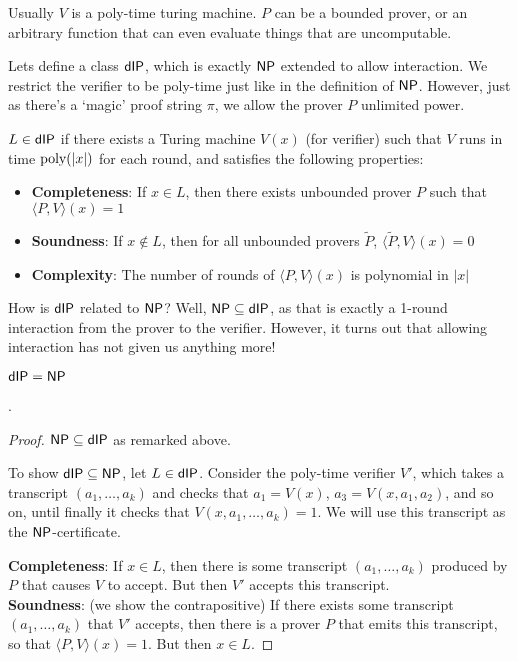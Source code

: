 \documentclass{article}
\begin{document}
Usually $V$ is a poly-time turing machine. $P$ can be a bounded prover, or an arbitrary function that can even evaluate things that are uncomputable.

Lets define a class $\mathsf{dIP}$, which is exactly $\mathsf{NP}$ extended to allow interaction.
We restrict the verifier to be poly-time just like in the definition of $\mathsf{NP}$.
However, just as there's a `magic' proof string $\pi$, we allow the prover $P$ unlimited power.

\begin{definition}
    $L \in \mathsf{dIP}$ if there exists a Turing machine $V(x)$ (for verifier) such that
    $V$ runs in time $\operatorname*{\textup{poly}}(|x|)$ for each round, and satisfies the following properties:
    \begin{itemize}
        \item \textbf{Completeness}: If $x \in L$, then there exists unbounded prover $P$ such that $\langle P, V \rangle(x) = 1$
        \item \textbf{Soundness}: If $x \notin L$, then for all unbounded provers $\tilde{P}$, $\langle \tilde{P}, V \rangle(x) = 0$
        \item \textbf{Complexity}: The number of rounds of $\langle P, V \rangle(x)$ is polynomial in $|x|$
    \end{itemize}
\end{definition}

How is $\mathsf{dIP}$ related to $\mathsf{NP}$? Well, $\mathsf{NP} \subseteq \mathsf{dIP}$, as that is exactly a 1-round interaction from the prover to the verifier.
However, it turns out that allowing interaction has not given us anything more!

\begin{claim} $\mathsf{dIP} = \mathsf{NP}$\end{claim}.
\begin{proof}
    $\mathsf{NP} \subseteq \mathsf{dIP}$ as remarked above.

    To show $\mathsf{dIP} \subseteq \mathsf{NP}$, let $L \in \mathsf{dIP}$.
    Consider the poly-time verifier $V'$, which takes a transcript $(a_1, \ldots, a_k)$ and checks that
    $a_1 = V(x)$, $a_3 = V(x, a_1, a_2)$, and so on, until finally it checks that $V(x, a_1, \ldots, a_k) = 1$. 
    We will use this transcript as the $\mathsf{NP}$-certificate.

    \textbf{Completeness}: If $x \in L$, then there is some transcript $(a_1, \ldots, a_k)$ produced by $P$ that causes $V$ to accept.
    But then $V'$ accepts this transcript. \\
    \textbf{Soundness}: (we show the contrapositive) If there exists some transcript $(a_1, \ldots, a_k)$ that $V'$ accepts, then there is a prover $P$ that emits this transcript, so that $\langle P, V \rangle(x) = 1$. But then $x \in L$.
\end{proof}
\end{document}
